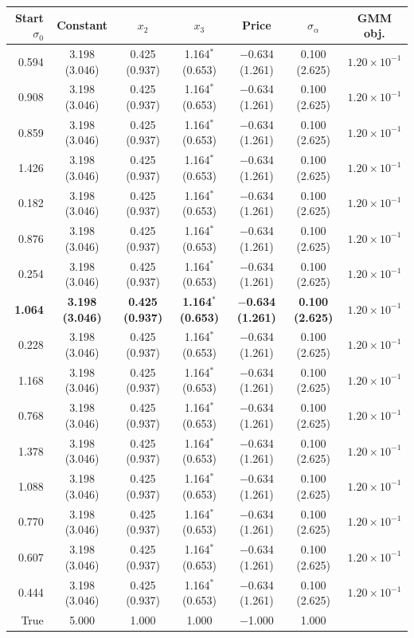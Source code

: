 \begin{tabular}{rcccccc}
\toprule
Start $\sigma_0$ & Constant & $x_2$ & $x_3$ & Price & $\sigma_\alpha$ & GMM obj. \\
\midrule
0.594 & 3.198 (3.046) & 0.425 (0.937) & 1.164$^{*}$ (0.653) & $-$0.634 (1.261) & 0.100 (2.625) & $1.20\times10^{-1}$ \\
0.908 & 3.198 (3.046) & 0.425 (0.937) & 1.164$^{*}$ (0.653) & $-$0.634 (1.261) & 0.100 (2.625) & $1.20\times10^{-1}$ \\
0.859 & 3.198 (3.046) & 0.425 (0.937) & 1.164$^{*}$ (0.653) & $-$0.634 (1.261) & 0.100 (2.625) & $1.20\times10^{-1}$ \\
1.426 & 3.198 (3.046) & 0.425 (0.937) & 1.164$^{*}$ (0.653) & $-$0.634 (1.261) & 0.100 (2.625) & $1.20\times10^{-1}$ \\
0.182 & 3.198 (3.046) & 0.425 (0.937) & 1.164$^{*}$ (0.653) & $-$0.634 (1.261) & 0.100 (2.625) & $1.20\times10^{-1}$ \\
0.876 & 3.198 (3.046) & 0.425 (0.937) & 1.164$^{*}$ (0.653) & $-$0.634 (1.261) & 0.100 (2.625) & $1.20\times10^{-1}$ \\
0.254 & 3.198 (3.046) & 0.425 (0.937) & 1.164$^{*}$ (0.653) & $-$0.634 (1.261) & 0.100 (2.625) & $1.20\times10^{-1}$ \\
\textbf{1.064} & \textbf{3.198 (3.046)} & \textbf{0.425 (0.937)} & \textbf{1.164$^{*}$ (0.653)} & \textbf{$-$0.634 (1.261)} & \textbf{0.100 (2.625)} & \textbf{$1.20\times10^{-1}$} \\
0.228 & 3.198 (3.046) & 0.425 (0.937) & 1.164$^{*}$ (0.653) & $-$0.634 (1.261) & 0.100 (2.625) & $1.20\times10^{-1}$ \\
1.168 & 3.198 (3.046) & 0.425 (0.937) & 1.164$^{*}$ (0.653) & $-$0.634 (1.261) & 0.100 (2.625) & $1.20\times10^{-1}$ \\
0.768 & 3.198 (3.046) & 0.425 (0.937) & 1.164$^{*}$ (0.653) & $-$0.634 (1.261) & 0.100 (2.625) & $1.20\times10^{-1}$ \\
1.378 & 3.198 (3.046) & 0.425 (0.937) & 1.164$^{*}$ (0.653) & $-$0.634 (1.261) & 0.100 (2.625) & $1.20\times10^{-1}$ \\
1.088 & 3.198 (3.046) & 0.425 (0.937) & 1.164$^{*}$ (0.653) & $-$0.634 (1.261) & 0.100 (2.625) & $1.20\times10^{-1}$ \\
0.770 & 3.198 (3.046) & 0.425 (0.937) & 1.164$^{*}$ (0.653) & $-$0.634 (1.261) & 0.100 (2.625) & $1.20\times10^{-1}$ \\
0.607 & 3.198 (3.046) & 0.425 (0.937) & 1.164$^{*}$ (0.653) & $-$0.634 (1.261) & 0.100 (2.625) & $1.20\times10^{-1}$ \\
0.444 & 3.198 (3.046) & 0.425 (0.937) & 1.164$^{*}$ (0.653) & $-$0.634 (1.261) & 0.100 (2.625) & $1.20\times10^{-1}$ \\
\midrule
True & 5.000 & 1.000 & 1.000 & $-$1.000 & 1.000 &  \\
\bottomrule
\end{tabular}
